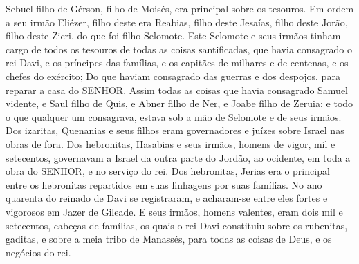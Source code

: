 {  Sebuel filho de Gérson, filho de Moisés, era principal sobre os tesouros.
  Em ordem a seu irmão Eliézer, filho deste era Reabias, filho deste Jesaías, filho deste Jorão, filho deste Zicri, do que foi filho Selomote.
  Este Selomote e seus irmãos tinham cargo de todos os tesouros de todas as coisas santificadas, que havia consagrado o rei Davi, e os príncipes das famílias, e os capitães de milhares e de centenas, e os chefes do exército;
  Do que haviam consagrado das guerras e dos despojos, para reparar a casa do SENHOR. %
  Assim todas as coisas que havia consagrado Samuel vidente, e Saul filho de Quis, e Abner filho de Ner, e Joabe filho de Zeruia: e todo o que qualquer um consagrava, estava sob a mão de Selomote e de seus irmãos.
  Dos izaritas, Quenanias e seus filhos eram governadores e juízes sobre Israel nas obras de fora.
  Dos hebronitas, Hasabias e seus irmãos, homens de vigor, mil e setecentos, governavam a Israel da outra parte do Jordão, ao ocidente, em toda a obra do SENHOR, e no serviço do rei.
  Dos hebronitas, Jerias era o principal entre os hebronitas repartidos em suas linhagens por suas famílias. No ano quarenta do reinado de Davi se registraram, e acharam-se entre eles fortes e vigorosos em Jazer de Gileade.
  E seus irmãos, homens valentes, eram dois mil e setecentos, cabeças de famílias, os quais o rei Davi constituiu sobre os rubenitas, gaditas, e sobre a meia tribo de Manassés, para todas as coisas de Deus, e os negócios do rei.
\par }

